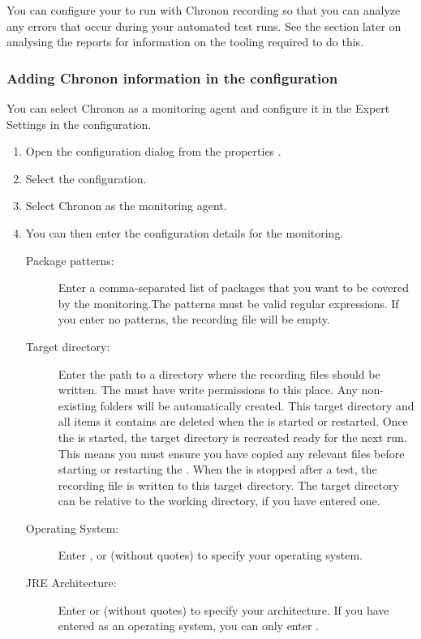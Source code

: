 You can configure your \gdaut{} to run with Chronon recording so that you can analyze any errors that occur during your automated test runs. See the section later  on analysing the reports for information on the tooling required to do this.


\subsubsection{Adding Chronon information in the \gdaut{} configuration}
You can select Chronon as a monitoring agent and configure it in the Expert Settings in the \gdaut{} configuration. 

\begin{enumerate}
\item Open the \gdaut{} configuration dialog from the \gdproject{} properties .
\item Select the  configuration. 
\item Select Chronon as the monitoring agent. 
\item You can then enter the configuration details for the monitoring. 
\begin{description}
\item [Package patterns:]{Enter a comma-separated list of packages that you want to be covered by the monitoring.The patterns must be  valid regular expressions. If you enter no patterns, the recording file will be empty.}
\item [Target directory:]{Enter the path to a directory where the recording files should be written. The \gdaut{} must have write permissions to this place. Any non-existing folders will be automatically created. This target directory and all items it contains are deleted when the \gdaut{} is started or restarted. Once the \gdaut{} is started, the target directory is recreated ready for the next run. This means you must ensure you have copied any relevant files before starting or restarting the \gdaut{}. When the \gdaut{} is stopped after a test, the recording file is written to this target directory. The target directory can be relative to the \gdaut{} working directory, if you have entered one.}
\item [Operating System:]{Enter  ,  or  (without quotes) to specify your operating system. }
\item[JRE Architecture:]{Enter  or  (without quotes) to specify your architecture. If you have entered  as an operating system, you can only enter .}
\end{description}
\end{enumerate}


